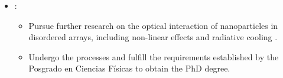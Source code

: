 \begin{itemize}
\begin{itemize}
			\item{} Based on theoretical and fabrication results, begin calibration for a phase-based biosensor with a disordered metasurface of spherical gold nanoparticles. 
			\item{} Begin the writing process of my PhD dissertation based on metasurfaces under realistic conditions.
		\end{itemize}	 
	\item {}:
			\begin{itemize}
		\item Pursue further research on the optical interaction of nanoparticles in disordered arrays, including non-linear effects \cite{krasnok_nonlinear_2018} and radiative cooling \cite{chen_investigating_2021}.
		\item Undergo the processes and fulfill the requirements established by the Posgrado en Ciencias Físicas to obtain the PhD degree.
	\end{itemize}	 
			
\end{itemize}
